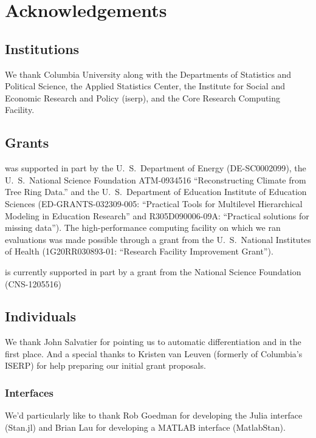 \chapter*{Acknowledgements}

\section*{Institutions}

We thank Columbia University along with the Departments of
Statistics and Political Science, the Applied Statistics Center, the
Institute for Social and Economic Research and Policy ({\sc iserp}),
and the Core Research Computing Facility.

\section*{Grants}

\Stan was supported in part by 
%
the U.~S.\ Department of Energy 
({\small DE-SC0002099}), 
%
the U.~S.\ National Science Foundation 
{\small ATM-0934516}
``Reconstructing Climate from Tree Ring Data.''
and 
%
the U.~S.\ Department of Education Institute of Education Sciences 
({\small ED-GRANTS-032309-005}:
 ``Practical Tools for Multilevel Hierarchical Modeling in Education
 Research'' and
 {\small R305D090006-09A}:
 ``Practical solutions for missing data'').
%
The high-performance computing
facility on which we ran evaluations was made possible through 
a grant from the U.~S.\ National Institutes of Health 
({\small 1G20RR030893-01}:
 ``Research Facility Improvement Grant'').

\Stan is currently supported in part by a grant from the National
Science Foundation (CNS-1205516)

\section*{Individuals}

We thank John Salvatier for pointing us to automatic differentiation
and \HMC in the first place.  And a special thanks to Kristen van
Leuven (formerly of Columbia's ISERP) for help preparing our initial
grant proposals.

\subsection*{Interfaces}

We'd particularly like to thank Rob Goedman for developing the Julia
interface (Stan.jl) and Brian Lau for developing a MATLAB interface
(MatlabStan). 

